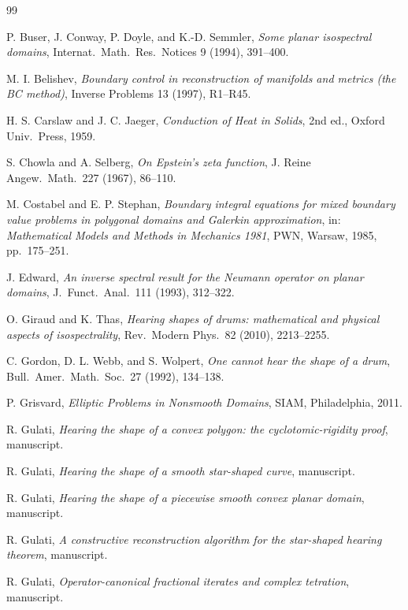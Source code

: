 \documentclass[11pt,reqno]{amsart}
\theoremstyle{plain}
\theoremstyle{definition}
\theoremstyle{remark}
\begin{document}
\begin{thebibliography}{99}

P. Buser, J. Conway, P. Doyle, and K.-D. Semmler,
\emph{Some planar isospectral domains},
Internat.\ Math.\ Res.\ Notices 9 (1994), 391--400.

M. I. Belishev,
\emph{Boundary control in reconstruction of manifolds and metrics (the BC method)},
Inverse Problems 13 (1997), R1--R45.

H. S. Carslaw and J. C. Jaeger,
\emph{Conduction of Heat in Solids},
2nd ed., Oxford Univ.\ Press, 1959.

S. Chowla and A. Selberg,
\emph{On Epstein's zeta function},
J. Reine Angew.\ Math.\ 227 (1967), 86--110.

M. Costabel and E. P. Stephan,
\emph{Boundary integral equations for mixed boundary value problems in polygonal domains and Galerkin approximation},
in: \emph{Mathematical Models and Methods in Mechanics 1981}, PWN, Warsaw, 1985, pp.\ 175--251.

J. Edward,
\emph{An inverse spectral result for the Neumann operator on planar domains},
J.\ Funct.\ Anal.\ 111 (1993), 312--322.

O. Giraud and K. Thas,
\emph{Hearing shapes of drums: mathematical and physical aspects of isospectrality},
Rev.\ Modern Phys.\ 82 (2010), 2213--2255.

C. Gordon, D. L. Webb, and S. Wolpert,
\emph{One cannot hear the shape of a drum},
Bull.\ Amer.\ Math.\ Soc.\ 27 (1992), 134--138.

P. Grisvard,
\emph{Elliptic Problems in Nonsmooth Domains},
SIAM, Philadelphia, 2011.

R. Gulati,
\emph{Hearing the shape of a convex polygon: the cyclotomic-rigidity proof},
manuscript.

R. Gulati,
\emph{Hearing the shape of a smooth star-shaped curve},
manuscript.

R. Gulati,
\emph{Hearing the shape of a piecewise smooth convex planar domain},
manuscript.

R. Gulati,
\emph{A constructive reconstruction algorithm for the star-shaped hearing theorem},
manuscript.

R. Gulati,
\emph{Operator-canonical fractional iterates and complex tetration},
manuscript.


\end{thebibliography}
\end{document}
